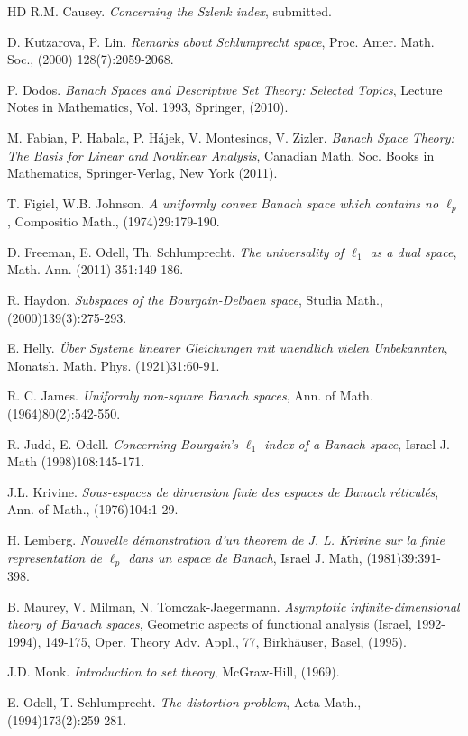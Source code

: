 \documentclass[12pt]{amsart}
\theoremstyle{definition}
\begin{document}
\begin{thebibliography}{HD}
 R.M. Causey. \emph{Concerning the Szlenk index}, submitted. 

 D. Kutzarova, P. Lin. \emph{Remarks about Schlumprecht space}, Proc. Amer. Math. Soc., (2000) 128(7):2059-2068. 

 P. Dodos.  \emph{Banach Spaces and Descriptive Set Theory: Selected Topics}, Lecture Notes in Mathematics, Vol. 1993, Springer, (2010).

 M. Fabian, P. Habala, P. H\'{a}jek, V. Montesinos, V. Zizler. \emph{Banach Space Theory: The Basis for Linear and Nonlinear Analysis}, Canadian Math. Soc. Books in Mathematics, Springer-Verlag, New York (2011). 

 T. Figiel, W.B. Johnson. \emph{A uniformly convex Banach space which contains no $\ell_p$}, Compositio Math., (1974)29:179-190. 

 D. Freeman, E. Odell, Th. Schlumprecht. \emph{The universality of $\ell_1$ as a dual space}, Math. Ann. (2011) 351:149-186. 

 R. Haydon. \emph{Subspaces of the Bourgain-Delbaen space}, Studia Math., (2000)139(3):275-293.  

 E. Helly. \emph{\"{U}ber Systeme linearer Gleichungen mit unendlich vielen Unbekannten}, Monatsh. Math. Phys. (1921)31:60-91. 


 R. C. James. \emph{Uniformly non-square Banach spaces}, Ann. of Math. (1964)80(2):542-550. 

 R. Judd, E. Odell. \emph{Concerning Bourgain's $\ell_1$ index of a Banach space}, Israel J. Math (1998)108:145-171. 

 J.L. Krivine. \emph{Sous-espaces de dimension finie des espaces de Banach r\'{e}ticul\'{e}s}, Ann. of Math., (1976)104:1-29. 

 H. Lemberg. \emph{Nouvelle d\'{e}monstration d'un theorem de J. L. Krivine sur la finie representation de $\ell_p$ dans un espace de Banach}, Israel J. Math, (1981)39:391-398. 

 B. Maurey, V. Milman, N. Tomczak-Jaegermann. \emph{Asymptotic infinite-dimensional theory of Banach spaces}, Geometric aspects of functional analysis (Israel, 1992-1994), 149-175, Oper. Theory Adv. Appl., 77, Birkh\"{a}user, Basel, (1995).  

 J.D. Monk. \emph{Introduction to set theory}, McGraw-Hill, (1969). 

 E. Odell, T. Schlumprecht. \emph{The distortion problem}, Acta Math., (1994)173(2):259-281. 


\end{thebibliography}
\end{document}
